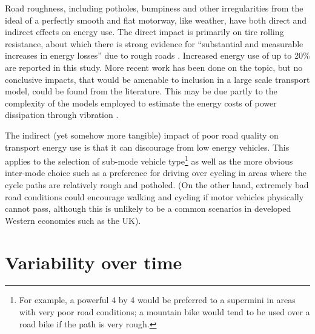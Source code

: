 Road roughness, including potholes, bumpiness and other irregularities
from the ideal of a perfectly smooth and flat motorway, like weather, have
both direct and indirect effects on energy use. The direct impact is primarily
on tire rolling resistance, about which there is strong evidence for
``substantial and measurable increases in energy losses'' due to
rough roads \citep{velinsky1980vehicle}. Increased energy use of up to
20\% are reported in this study. More recent work has been done on the topic,
but no conclusive impacts, that would be amenable to inclusion in a
large scale transport model, could be found from the literature.
This may be due partly to the complexity of the models employed to
estimate the energy costs of power dissipation through vibration
\citep{smith2011power}.

The indirect (yet somehow more tangible) impact of poor road quality on
transport energy use is that it can discourage from low energy vehicles.
This applies to the selection of sub-mode vehicle
type\footnote{For example,
a powerful 4 by 4 would be
preferred to a supermini in areas with very poor road conditions; a
mountain bike would tend to be used over a road bike if the path is
very rough.
}
as well as the more obvious inter-mode choice such as a
preference for driving over cycling
in areas where the cycle paths are relatively rough and potholed.
(On the other hand, extremely bad road conditions could encourage
walking and cycling if motor vehicles physically cannot pass, although
this is unlikely to be a common scenarios in developed Western economies
such as the UK). 


\section{Variability over time} %
\label{s:eff-imps}
